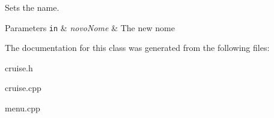 Sets the name. 


\begin{DoxyParams}[1]{Parameters}
\mbox{\tt in}  & {\em novo\+Nome} & The new nome \\
\hline
\end{DoxyParams}


The documentation for this class was generated from the following files\+:\begin{DoxyCompactItemize}
\item 
cruise.\+h\item 
cruise.\+cpp\item 
menu.\+cpp\end{DoxyCompactItemize}
